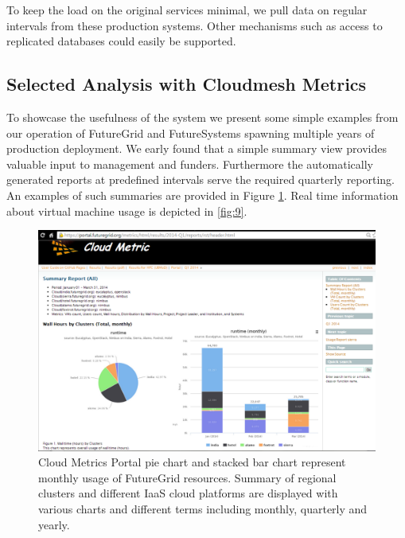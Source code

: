 \documentclass{sig-alternate-05-2015}
\begin{document}
To keep the load on the original services minimal, we pull data on regular intervals from these production systems. Other mechanisms such as access to replicated databases could easily be supported.

\subsection{Selected Analysis with Cloudmesh Metrics}

To showcase the usefulness of the system we present some simple examples from our operation of FutureGrid and FutureSystems spawning multiple years of production deployment. We early found that a simple summary view provides valuable input to management and funders.  Furthermore the automatically generated reports at predefined intervals serve the required quarterly reporting. An examples of such summaries are provided in Figure \ref{F:fig8}. Real time information about virtual machine usage is depicted in \ref{fig:9}.

\begin{figure}[htb] 
  \centering 
    \includegraphics[width=1.0\columnwidth]{images/metrics-portal.pdf} 
  \caption{Cloud Metrics Portal pie chart and stacked bar chart represent monthly usage of FutureGrid resources. Summary of regional clusters and different IaaS cloud platforms are displayed with various charts and different terms including monthly, quarterly and yearly.}\label{F:fig8} 
\end{figure} 
\end{document}

